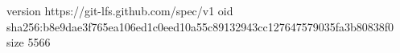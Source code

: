 version https://git-lfs.github.com/spec/v1
oid sha256:b8e9dae3f765ea106ed1c0eed10a55c89132943cc127647579035fa3b80838f0
size 5566
